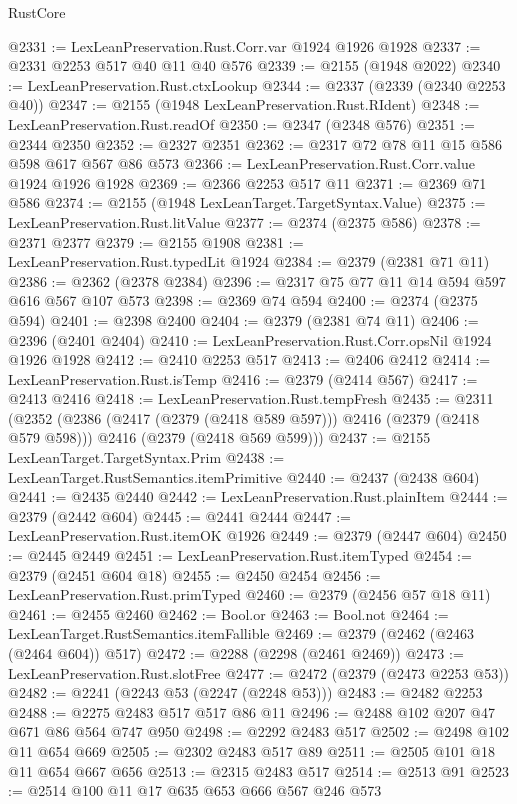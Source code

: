 \begin{lexlean}{RustCore}
\begin{coremodule}
@2331 := LexLeanPreservation.Rust.Corr.var @1924 @1926 @1928
@2337 := @2331 @2253 @517 @40 @11 @40 @576
@2339 := @2155 (@1948 @2022)
@2340 := LexLeanPreservation.Rust.ctxLookup
@2344 := @2337 (@2339 (@2340 @2253 @40))
@2347 := @2155 (@1948 LexLeanPreservation.Rust.RIdent)
@2348 := LexLeanPreservation.Rust.readOf
@2350 := @2347 (@2348 @576)
@2351 := @2344 @2350
@2352 := @2327 @2351
@2362 := @2317 @72 @78 @11 @15 @586 @598 @617 @567 @86 @573
@2366 := LexLeanPreservation.Rust.Corr.value @1924 @1926 @1928
@2369 := @2366 @2253 @517 @11
@2371 := @2369 @71 @586
@2374 := @2155 (@1948 LexLeanTarget.TargetSyntax.Value)
@2375 := LexLeanPreservation.Rust.litValue
@2377 := @2374 (@2375 @586)
@2378 := @2371 @2377
@2379 := @2155 @1908
@2381 := LexLeanPreservation.Rust.typedLit @1924
@2384 := @2379 (@2381 @71 @11)
@2386 := @2362 (@2378 @2384)
@2396 := @2317 @75 @77 @11 @14 @594 @597 @616 @567 @107 @573
@2398 := @2369 @74 @594
@2400 := @2374 (@2375 @594)
@2401 := @2398 @2400
@2404 := @2379 (@2381 @74 @11)
@2406 := @2396 (@2401 @2404)
@2410 := LexLeanPreservation.Rust.Corr.opsNil @1924 @1926 @1928
@2412 := @2410 @2253 @517
@2413 := @2406 @2412
@2414 := LexLeanPreservation.Rust.isTemp
@2416 := @2379 (@2414 @567)
@2417 := @2413 @2416
@2418 := LexLeanPreservation.Rust.tempFresh
@2435 := @2311
    (@2352
      (@2386 (@2417 (@2379 (@2418 @589 @597))) @2416 (@2379 (@2418 @579 @598)))
      @2416
      (@2379 (@2418 @569 @599)))
@2437 := @2155 LexLeanTarget.TargetSyntax.Prim
@2438 := LexLeanTarget.RustSemantics.itemPrimitive
@2440 := @2437 (@2438 @604)
@2441 := @2435 @2440
@2442 := LexLeanPreservation.Rust.plainItem
@2444 := @2379 (@2442 @604)
@2445 := @2441 @2444
@2447 := LexLeanPreservation.Rust.itemOK @1926
@2449 := @2379 (@2447 @604)
@2450 := @2445 @2449
@2451 := LexLeanPreservation.Rust.itemTyped
@2454 := @2379 (@2451 @604 @18)
@2455 := @2450 @2454
@2456 := LexLeanPreservation.Rust.primTyped
@2460 := @2379 (@2456 @57 @18 @11)
@2461 := @2455 @2460
@2462 := Bool.or
@2463 := Bool.not
@2464 := LexLeanTarget.RustSemantics.itemFallible
@2469 := @2379 (@2462 (@2463 (@2464 @604)) @517)
@2472 := @2288 (@2298 (@2461 @2469))
@2473 := LexLeanPreservation.Rust.slotFree
@2477 := @2472 (@2379 (@2473 @2253 @53))
@2482 := @2241 (@2243 @53 (@2247 (@2248 @53)))
@2483 := @2482 @2253
@2488 := @2275 @2483 @517 @517 @86 @11
@2496 := @2488 @102 @207 @47 @671 @86 @564 @747 @950
@2498 := @2292 @2483 @517
@2502 := @2498 @102 @11 @654 @669
@2505 := @2302 @2483 @517 @89
@2511 := @2505 @101 @18 @11 @654 @667 @656
@2513 := @2315 @2483 @517
@2514 := @2513 @91
@2523 := @2514 @100 @11 @17 @635 @653 @666 @567 @246 @573

\end{coremodule}
\end{lexlean}

